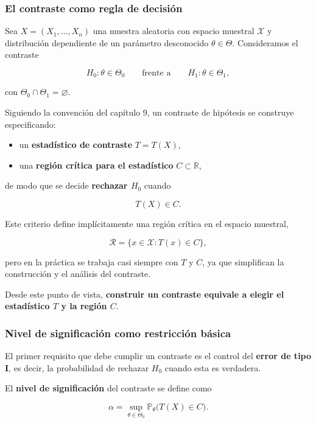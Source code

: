 \documentclass[
]{article}
\providecommand{\tightlist}{%
  \setlength{\itemsep}{0pt}\setlength{\parskip}{0pt}}
\begin{document}
\subsubsection{El contraste como regla de decisión}\label{el-contraste-como-regla-de-decisiuxf3n}

Sea \(X=(X_1,\dots,X_n)\) una muestra aleatoria con espacio muestral \(\mathcal{X}\) y distribución dependiente de un parámetro desconocido \(\theta\in\Theta\). Consideramos el contraste

\[
H_0:\theta\in\Theta_0
\qquad \text{frente a} \qquad
H_1:\theta\in\Theta_1,
\]

con \(\Theta_0\cap\Theta_1=\varnothing\).

Siguiendo la convención del capítulo 9, un contraste de hipótesis se construye especificando:

\begin{itemize}
\tightlist
\item
  un \textbf{estadístico de contraste} \(T=T(X)\),
\item
  una \textbf{región crítica para el estadístico} \(C\subset\mathbb{R}\),
\end{itemize}

de modo que se decide \textbf{rechazar \(H_0\)} cuando

\[
T(X)\in C.
\]

Este criterio define implícitamente una región crítica en el espacio muestral,

\[
\mathcal{R}=\{x\in\mathcal{X}:T(x)\in C\},
\]

pero en la práctica se trabaja casi siempre con \(T\) y \(C\), ya que simplifican la construcción y el análisis del contraste.

Desde este punto de vista, \textbf{construir un contraste equivale a elegir el estadístico \(T\) y la región \(C\)}.

\subsubsection{Nivel de significación como restricción básica}\label{nivel-de-significaciuxf3n-como-restricciuxf3n-buxe1sica}

El primer requisito que debe cumplir un contraste es el control del \textbf{error de tipo I}, es decir, la probabilidad de rechazar \(H_0\) cuando esta es verdadera.

El \textbf{nivel de significación} del contraste se define como

\[
\alpha
=
\sup_{\theta\in\Theta_0}
\mathbb{P}_\theta\bigl(T(X)\in C\bigr).
\]
\end{document}
